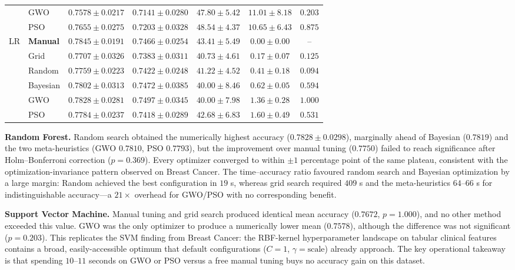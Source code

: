 \documentclass[letterpaper, 10 pt, conference]{ieeeconf}
\begin{document}
\begin{table}[t]
\begin{tabular}{|l|l|c|c|c|c|c|}
		& GWO      & $0.7578 \pm 0.0217$ & $0.7141 \pm 0.0280$ & $47.80 \pm 5.42$ & $11.01 \pm 8.18$ & $0.203$ \\
		& PSO      & $0.7655 \pm 0.0275$ & $0.7203 \pm 0.0328$ & $48.54 \pm 4.37$ & $10.65 \pm 6.43$ & $0.875$ \\
		\hline
		\multirow{6}{*}{LR}
		& \textbf{Manual}   & $\mathbf{0.7845 \pm 0.0191}$ & $0.7466 \pm 0.0254$ & $43.41 \pm 5.49$ & $0.00 \pm 0.00$ & -- \\
		& Grid     & $0.7707 \pm 0.0326$ & $0.7383 \pm 0.0311$ & $40.73 \pm 4.61$ & $0.17 \pm 0.07$ & $0.125$ \\
		& Random   & $0.7759 \pm 0.0223$ & $0.7422 \pm 0.0248$ & $41.22 \pm 4.52$ & $0.41 \pm 0.18$ & $0.094$ \\
		& Bayesian & $0.7802 \pm 0.0313$ & $0.7472 \pm 0.0385$ & $40.00 \pm 8.46$ & $0.62 \pm 0.05$ & $0.594$ \\
		& GWO      & $0.7828 \pm 0.0281$ & $0.7497 \pm 0.0345$ & $40.00 \pm 7.98$ & $1.36 \pm 0.28$ & $1.000$ \\
		& PSO      & $0.7784 \pm 0.0237$ & $0.7418 \pm 0.0289$ & $42.68 \pm 6.83$ & $1.60 \pm 0.49$ & $0.531$ \\
		\hline
	\end{tabular}
\end{table}

\textbf{Random Forest.} Random search obtained the numerically highest accuracy ($0.7828 \pm 0.0298$), marginally ahead of Bayesian ($0.7819$) and the two meta-heuristics (GWO $0.7810$, PSO $0.7793$), but the improvement over manual tuning ($0.7750$) failed to reach significance after Holm--Bonferroni correction ($p = 0.369$). Every optimizer converged to within $\pm 1$ percentage point of the same plateau, consistent with the optimization-invariance pattern observed on Breast Cancer. The time--accuracy ratio favoured random search and Bayesian optimization by a large margin: Random achieved the best configuration in $19$ s, whereas grid search required $409$ s and the meta-heuristics $64$--$66$ s for indistinguishable accuracy---a $21\times$ overhead for GWO/PSO with no corresponding benefit.

\textbf{Support Vector Machine.} Manual tuning and grid search produced identical mean accuracy ($0.7672$, $p = 1.000$), and no other method exceeded this value. GWO was the only optimizer to produce a numerically lower mean ($0.7578$), although the difference was not significant ($p = 0.203$). This replicates the SVM finding from Breast Cancer: the RBF-kernel hyperparameter landscape on tabular clinical features contains a broad, easily-accessible optimum that default configurations ($C = 1$, $\gamma = \text{scale}$) already approach. The key operational takeaway is that spending $10$--$11$ seconds on GWO or PSO versus a free manual tuning buys no accuracy gain on this dataset.
\end{document}
